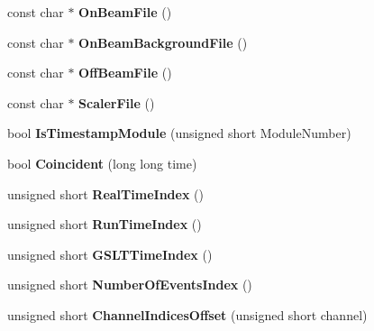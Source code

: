 \begin{DoxyCompactItemize}
const char $\ast$ {\bfseries On\+Beam\+File} ()
\item 
\mbox{\label{class_global_settings_aeed9285f4c68b974c23a4db5d89f3ed5}} 
const char $\ast$ {\bfseries On\+Beam\+Background\+File} ()
\item 
\mbox{\label{class_global_settings_a156b6901d18059153c65ee043b9077b2}} 
const char $\ast$ {\bfseries Off\+Beam\+File} ()
\item 
\mbox{\label{class_global_settings_a262856ae6329c24152ca5056e71f1f94}} 
const char $\ast$ {\bfseries Scaler\+File} ()
\item 
\mbox{\label{class_global_settings_a1fd06f7b8b9818d1f86f290241d3c923}} 
bool {\bfseries Is\+Timestamp\+Module} (unsigned short Module\+Number)
\item 
\mbox{\label{class_global_settings_aaee3450f69d50e203651d31c2069955c}} 
bool {\bfseries Coincident} (long long time)
\item 
\mbox{\label{class_global_settings_a973a2930c1c9d1d3a5fffbeb0f91f1d2}} 
unsigned short {\bfseries Real\+Time\+Index} ()
\item 
\mbox{\label{class_global_settings_a8917b578821e73520f027890799cbc15}} 
unsigned short {\bfseries Run\+Time\+Index} ()
\item 
\mbox{\label{class_global_settings_ae67adcfbae5f32f70dbaccb354083599}} 
unsigned short {\bfseries G\+S\+L\+T\+Time\+Index} ()
\item 
\mbox{\label{class_global_settings_a16fcf54c004f5b2cf38aafd747fd8df3}} 
unsigned short {\bfseries Number\+Of\+Events\+Index} ()
\item 
\mbox{\label{class_global_settings_a9832ff3e3e2c8ffdd743ecef761c29fb}} 
unsigned short {\bfseries Channel\+Indices\+Offset} (unsigned short channel)
\item 
\mbox{\label{class_global_settings_a7984f02f9041a1a053a5bb504814aff5}} 

\end{DoxyCompactItemize}
